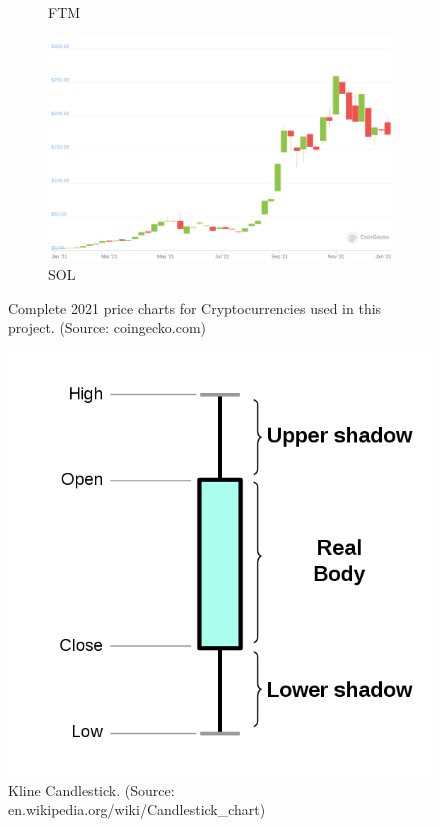\documentclass[11pt]{article}
\begin{document}
\begin{figure}
\begin{subfigure}[b]{0.4\textwidth}
         \caption{FTM}
         \label{ftm2021}
     \end{subfigure}
      \hfill
     \begin{subfigure}[b]{0.4\textwidth}
         \centering
         \includegraphics[width=\textwidth]{figures/sol2021.png}
         \caption{SOL}
         \label{sol2021}
     \end{subfigure}
        \caption{Complete 2021 price charts for Cryptocurrencies used in this project. (Source: coingecko.com)}
        \label{fig:coingecko2021}
\end{figure}

\begin{figure}
\centering
\includegraphics[scale=0.2]{figures/candlestickwiki.png}
\caption {Kline Candlestick. (Source: en.wikipedia.org/wiki/Candlestick\_chart)}
\label{fig:candlestick}
\end{figure}
\end{document}

